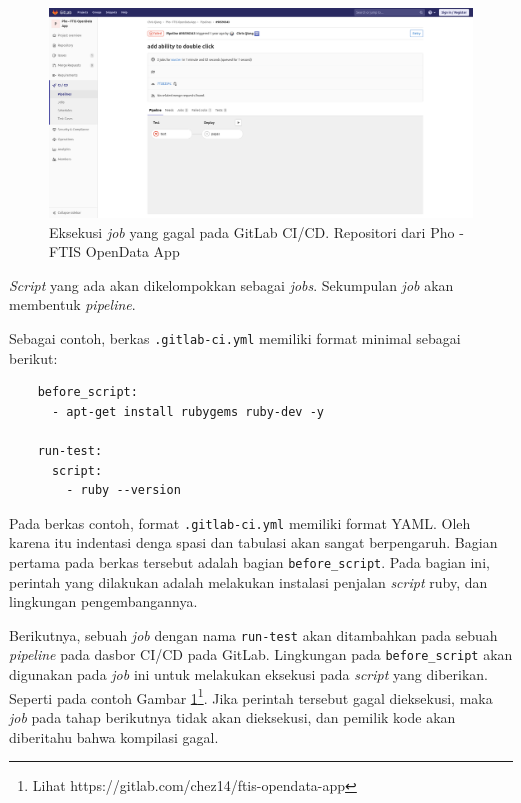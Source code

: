     \begin{figure}
        \centering
        \includegraphics[width=0.7\paperwidth]{Gambar/gitlab-ci-job-view.png}
        \caption{Eksekusi \textit{job} yang gagal pada GitLab CI/CD.
        Repositori dari Pho - FTIS OpenData App}
        \label{fig:gitlab-ci:jobrun}
    \end{figure}
    
    
    \textit{Script} yang ada akan dikelompokkan sebagai \textit{jobs}.
    Sekumpulan \textit{job} akan membentuk \textit{pipeline}.
    
    Sebagai contoh, berkas \texttt{.gitlab-ci.yml} memiliki format minimal
    sebagai berikut:
    
    \begin{verbatim}
    before_script:
      - apt-get install rubygems ruby-dev -y

    run-test:
      script:
        - ruby --version
    \end{verbatim}
    
    Pada berkas contoh, format \texttt{.gitlab-ci.yml} memiliki format YAML.
    Oleh karena itu indentasi denga spasi dan tabulasi akan sangat berpengaruh.
    Bagian pertama pada berkas tersebut adalah bagian \texttt{before\_script}.
    Pada bagian ini, perintah yang dilakukan adalah melakukan instalasi penjalan
    \textit{script} ruby, dan lingkungan pengembangannya.
    
    Berikutnya, sebuah \textit{job} dengan nama \texttt{run-test} akan
    ditambahkan pada sebuah \textit{pipeline} pada dasbor CI/CD pada GitLab.
    Lingkungan pada \texttt{before\_script} akan digunakan pada \textit{job} ini
    untuk melakukan eksekusi pada \textit{script} yang diberikan. Seperti pada
    contoh Gambar \ref{fig:gitlab-ci:jobrun}\footnote{Lihat https://gitlab.com/chez14/ftis-opendata-app}. Jika perintah tersebut gagal
    dieksekusi, maka \textit{job} pada tahap berikutnya tidak akan dieksekusi,
    dan pemilik kode akan diberitahu bahwa kompilasi gagal.
    
